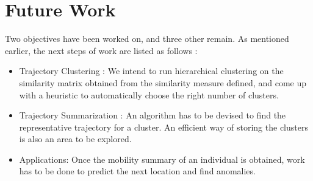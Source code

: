 \section{Future Work}

Two objectives have been worked on, and three other remain. As mentioned earlier, the next steps of work are listed as follows :

\begin{itemize}
\item Trajectory Clustering : We intend to run hierarchical clustering on the similarity matrix obtained from the similarity measure defined, and come up with a heuristic to automatically choose the right number of clusters. 
\item Trajectory Summarization : An algorithm has to be devised to find the representative trajectory for a cluster. An efficient way of storing the clusters is also an area to be explored.
\item Applications: Once the mobility summary of an individual is obtained, work has to be done to predict the next location and find anomalies. 
\end{itemize}